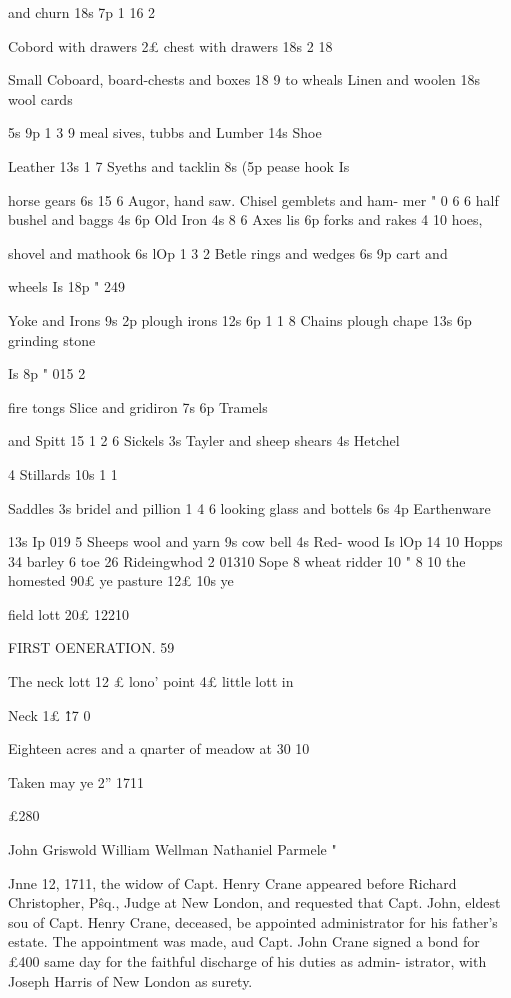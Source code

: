 and churn 18s  7p 1  16  2 

Cobord with drawers 2£ chest with drawers 18s 2  18  

Small Coboard, board-chests and boxes  18  9 
to wheals Linen and woolen 18s wool cards 

5s 9p 1 3 9 
meal sives, tubbs and Lumber 14s Shoe 

Leather 13s 1  7  
Syeths and tacklin 8s  (5p pease hook Is 

horse gears 6s   15  6 
Augor, hand saw. Chisel gemblets and ham- 
mer " 0 6 6 
half bushel and baggs 4s  6p Old Iron 4s  8  6 
Axes lis  6p forks and rakes 4  10 hoes, 

shovel and mathook 6s  lOp 1  3  2 
Betle rings and wedges 6s  9p cart and 

wheels Is 18p " 249 

Yoke and Irons 9s  2p plough irons 12s  6p 1  1  8 
Chains plough chape 13s  6p grinding stone 

Is 8p " 015 2 

fire tongs Slice and gridiron 7s  6p Tramels 

and Spitt 15 1  2  6 
Sickels 3s Tayler and sheep shears 4s Hetchel 

4 Stillards 10s 1 1 

Saddles 3s bridel and pillion 1  4  6 
looking glass and bottels 6s  4p Earthenware 

13s Ip 019 5 
Sheeps wool and yarn 9s cow bell 4s Red- 
wood Is  lOp  14  10 
Hopps 34 barley 6 toe 26 Rideingwhod 2 01310 
Sope 8 wheat ridder 10  "  8  10 
the homested 90£ ye pasture 12£  10s ye 

field lott 20£ 12210 



FIRST OENERATION. 59 

The neck lott 12 £ lono' point 4£ little lott in 

Neck 1£ \^ 17 0 

Eighteen acres and a qnarter of meadow at 30  10  



Taken may ye 2'' 1711 



£280   

John Griswold 
William Wellman 
Nathaniel Parmele " 



Jnne 12, 1711, the widow of Capt. Henry Crane appeared 
before Richard Christopher, P\^sq., Judge at New London, and 
requested that Capt. John, eldest sou of Capt. Henry Crane, 
deceased, be appointed administrator for his father's estate. The 
appointment was made, aud Capt. John Crane signed a bond for 
£400 same day for the faithful discharge of his duties as admin- 
istrator, with Joseph Harris of New London as surety. 

